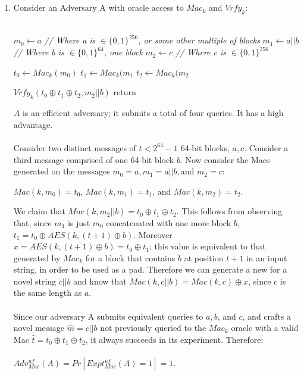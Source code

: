 \documentclass[]{article}
\begin{document}
\section{}
\begin{enumerate}[label=(\alph*)]
	\item Consider an Adversary A with oracle access to $Mac_k$ and $Vrfy_k$:
	\\\\
	\begin{algorithm}[H]
		\SetAlgoLined
		$m_0 \leftarrow a $ \emph{// Where a is $\in \{0,1\}^{256}$, or some other multiple of blocks}\;
		$m_1 \leftarrow  a || b $ \emph{// Where b is $\in \{0,1\}^{64}$, one block}\;
		$m_2 \leftarrow  c $ \emph{// Where c is $\in \{0,1\}^{256}$}\;
			
		$t_0 \leftarrow Mac_k(m_0)$\;
		$t_1 \leftarrow Mac_k(m_1$\;
		$t_2 \leftarrow Mac_k(m_2$\;
		
		$Vrfy_k(t_0 \oplus t_1 \oplus t_2, m_2 || b)$\;
		return\;
		\caption{$A(Mac)$}
	\end{algorithm}

	$A$ is an efficient adversary; it submits a total of four queries. It has a high advantage.
	\\\\
	Consider two distinct messages of $t < 2^{64} - 1$ 64-bit blocks, $a, c$. Consider a third message comprised of one 64-bit block $b$. Now consider the Macs generated on the messages $m_0 = a, m_1 = a ||b, $and $m_2 = c$:
	
	$Mac(k, m_0) = t_0$,
	$Mac(k, m_1) = t_1$, and 
	$Mac(k, m_2) = t_2$.
	
	We claim that $Mac(k, m_2 || b) = t_0 \oplus t_1 \oplus t_2$. This follows from observing that, since $m_1$ is just $m_0$ concatenated with one more block $b$, $t_1 = t_0 \oplus AES(k, (t + 1) \oplus b)$. Moreover $x = AES(k, (t + 1) \oplus b) = t_0 \oplus t_1$; this value is equivalent to that generated by $Mac_k$ for a block that contains $b$ at position $t+1$ in an input string, in order to be used as a pad. Therefore we can generate a new for a novel string $c || b$ and know that $Mac(k, c ||b) = Mac(k, c) \oplus x$, since $c$ is the same length as $a$.
	\\\\
	Since our adversary A submits equivalent queries to $a, b$, and $c$, and crafts a novel message $\hat{m} = c || b$ not previously queried to the $Mac_k$ oracle with a valid Mac $\hat{t} = t_0 \oplus t_1 \oplus t_2$, it always succeeds in its experiment. Therefore:
	\\\\
	$Adv_{Mac}^{uf}(A) = Pr[Expt^{uf}_{Mac}(A) = 1] = 1$.
	

\end{enumerate}
\end{document}

